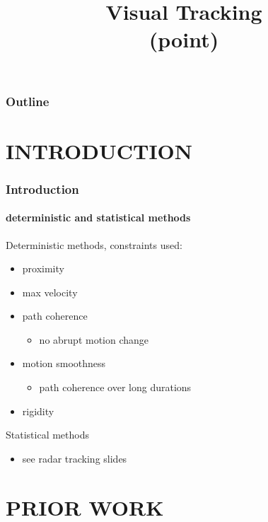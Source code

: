 
\title{Visual Tracking \\ (point)}
\begin{frame}[plain]\logoTechTower
	\titlepage
\end{frame}

\begin{frame}
\frametitle{Outline}
\logoCSIPCPL\logoTechTower
	\setcounter{tocdepth}{1}	
	\tableofcontents
\end{frame}

\section{INTRODUCTION}
\begin{frame}
\frametitle{Introduction}
\framesubtitle{deterministic and statistical methods}
\logoCSIPCPL\mypagenum
	{\color{red}Deterministic methods, constraints used:}
	\begin{itemize}
		\item proximity
		\item max velocity
		\item path coherence
			\begin{itemize}
				\item no abrupt motion change
			\end{itemize}
		\item motion smoothness
			\begin{itemize}
				\item path coherence over long durations
			\end{itemize}			
		\item rigidity
	\end{itemize}
	\vspace{0.1in}
	{\color{red}Statistical methods}
	\begin{itemize}
		\item see radar tracking slides
	\end{itemize}
\end{frame}


\section{PRIOR WORK}
